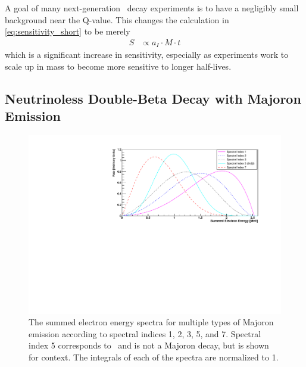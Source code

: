 A goal of many next-generation \zeronubb~decay experiments is to have a negligibly small background near the Q-value. This changes the calculation in \autoref{eq:sensitivity_short} to be merely
\begin{align}
    S &\propto a_I \cdot M \cdot t
\end{align}
which is a significant increase in sensitivity, especially as experiments work to scale up in mass to become more sensitive to longer half-lives.
\subsection{Neutrinoless Double-Beta Decay with Majoron Emission}
\label{ssec:Neutrinoless Double-Beta Decay with Majoron Emisison}

\begin{figure}
    \centering
    \includegraphics[width=0.8\linewidth]{Figures/EnergySpectrum_fixedFermi.pdf}
    \caption[The summed electron energy spectra for multiple types of Majoron emission according to spectral indices 1, 2, 3, 5, and 7.]{The summed electron energy spectra for multiple types of Majoron emission according to spectral indices 1, 2, 3, 5, and 7. Spectral index 5 corresponds to \twonubb~and is not a Majoron decay, but is shown for context. The integrals of each of the spectra are normalized to 1.}
    \label{fig:Majoron Spectrum}
\end{figure}

